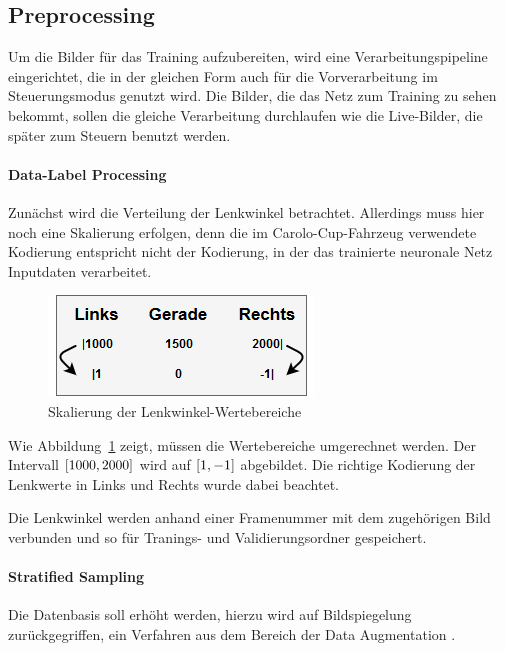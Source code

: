 \subsection{Preprocessing}
Um die Bilder für das Training aufzubereiten, wird eine Verarbeitungspipeline eingerichtet, die in der gleichen Form auch für die Vorverarbeitung im Steuerungsmodus genutzt wird. Die Bilder, die das Netz zum Training zu \glqq sehen \grqq{} bekommt, sollen die gleiche Verarbeitung durchlaufen wie die Live-Bilder, die später zum Steuern benutzt werden. 

\paragraph{Data-Label Processing}
Zunächst wird die Verteilung der Lenkwinkel betrachtet. Allerdings muss hier noch eine Skalierung erfolgen, denn die im Carolo-Cup-Fahrzeug verwendete Kodierung entspricht nicht der Kodierung, in der das trainierte neuronale Netz Inputdaten verarbeitet.

\begin{figure}[h]
	\centering
	\includegraphics[scale=0.6]{figures/Lenkwinkelskalierung.png}
	\caption{Skalierung der Lenkwinkel-Wertebereiche}
	\label{img:skalierunglenkwinkel}
\end{figure}

Wie Abbildung~\ref{img:skalierunglenkwinkel} zeigt, müssen die Wertebereiche umgerechnet werden. Der Intervall $\interval{1000}{2000}$ wird auf $\interval{1}{-1}$ abgebildet. Die richtige Kodierung der Lenkwerte in Links und Rechts wurde dabei beachtet.

Die Lenkwinkel werden anhand einer Framenummer mit dem zugehörigen Bild verbunden und so für Tranings- und Validierungsordner gespeichert.

\paragraph{Stratified Sampling}
Die Datenbasis soll erhöht werden, hierzu wird auf Bildspiegelung zurückgegriffen, ein Verfahren aus dem Bereich der Data Augmentation \cite{doi:10.1198/10618600152418584} \cite{perez2017effectiveness}.

